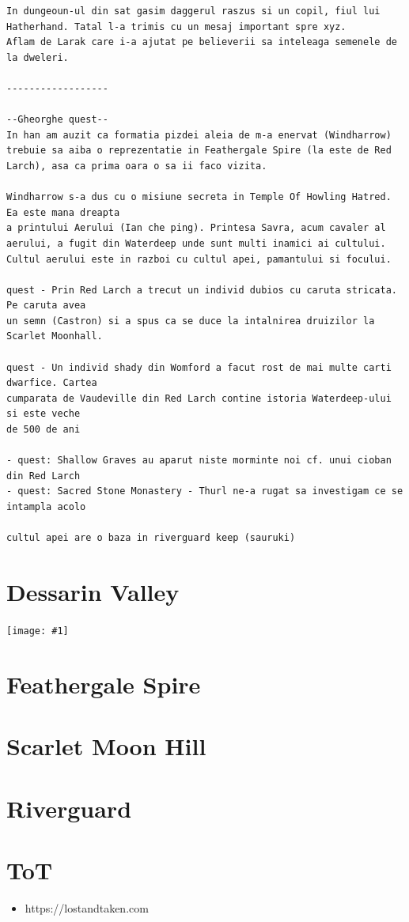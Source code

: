 \documentclass[12pt,twoside]{book}
\newcommand{\showmap}[1]{
	\begin{center}
		\texttt{[image: \#1]}
	\end{center}
}
\begin{document}
\begin{verbatim}
In dungeoun-ul din sat gasim daggerul raszus si un copil, fiul lui Hatherhand. Tatal l-a trimis cu un mesaj important spre xyz.
Aflam de Larak care i-a ajutat pe believerii sa inteleaga semenele de la dweleri.

------------------

--Gheorghe quest--
In han am auzit ca formatia pizdei aleia de m-a enervat (Windharrow) trebuie sa aiba o reprezentatie in Feathergale Spire (la este de Red Larch), asa ca prima oara o sa ii faco vizita. 

Windharrow s-a dus cu o misiune secreta in Temple Of Howling Hatred. Ea este mana dreapta
a printului Aerului (Ian che ping). Printesa Savra, acum cavaler al aerului, a fugit din Waterdeep unde sunt multi inamici ai cultului.
Cultul aerului este in razboi cu cultul apei, pamantului si focului.

quest - Prin Red Larch a trecut un individ dubios cu caruta stricata. Pe caruta avea 
un semn (Castron) si a spus ca se duce la intalnirea druizilor la Scarlet Moonhall.

quest - Un individ shady din Womford a facut rost de mai multe carti dwarfice. Cartea
cumparata de Vaudeville din Red Larch contine istoria Waterdeep-ului si este veche 
de 500 de ani

- quest: Shallow Graves au aparut niste morminte noi cf. unui cioban din Red Larch
- quest: Sacred Stone Monastery - Thurl ne-a rugat sa investigam ce se intampla acolo

cultul apei are o baza in riverguard keep (sauruki)
\end{verbatim}

\newpage

\section{Dessarin Valley}

	\showmap{images/maps/dessarin-valley}

\newpage

\section{Feathergale Spire}

\section{Scarlet Moon Hill}

\section{Riverguard}

\newpage

\section{ToT}
\begin{itemize}
	\item https://lostandtaken.com
\end{itemize}
\end{document}
